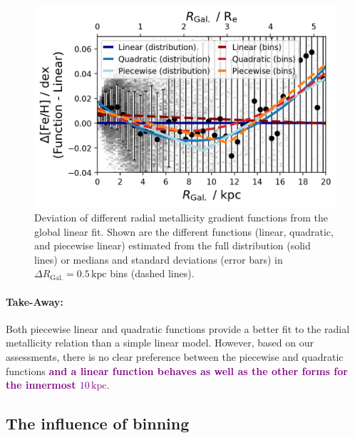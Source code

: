 \documentclass[twocolumn,apj,numberedappendix,appendixfloats,twocolappendix]{openjournal}
\newcommand{\adjusted}[1]{\textbf{\textcolor{purple}{#1}}}
\begin{document}
\begin{CJK*}{UTF8}{gbsn}
\begin{figure}
    \centering
    \includegraphics[width=\columnwidth]{figures/linear_quadratic_piecewise.png}
    \caption{Deviation of different radial metallicity gradient functions from the global linear fit. Shown are the different functions (linear, quadratic, and piecewise linear) estimated from the full distribution (solid lines) or medians and standard deviations (error bars) in $\Delta R_\mathrm{Gal.} = 0.5\,\mathrm{kpc}$ bins (dashed lines).}
    \label{fig:linear_quadratic_piecewise}
\end{figure}

\paragraph*{Take-Away:} Both piecewise linear and quadratic functions provide a better fit to the radial metallicity relation than a simple linear model. However, based on our assessments, there is no clear preference between the piecewise and quadratic functions \adjusted{and a linear function behaves as well as the other forms for the innermost $10\,\mathrm{kpc}$}.

\subsection{The influence of binning}
\label{sec:binning}


\end{CJK*}
\end{document}

